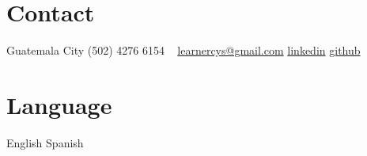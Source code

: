 \documentclass[]{friggeri-cv} %
\begin{document}


\begin{aside} %
\section{Contact}
	Guatemala City
	(502) 4276 6154
	~
	\href{mailto:learnercys@gmail.com}{learnercys@gmail.com}
	\href{https://www.linkedin.com/pub/carlos-hern\%C3\%A1ndez/87/1b1/157}{linkedin}
	\href{https://github.com/learnercys}{github}
\section{Language}
	English	
	Spanish
\end{aside}

\end{document}
